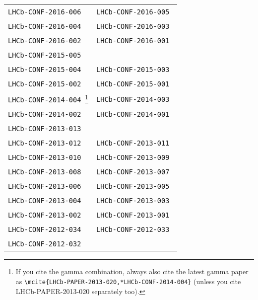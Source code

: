 \begin{center}
\begin{longtable}{ll}
\texttt{LHCb-CONF-2016-006}~\cite{LHCb-CONF-2016-006} &
\texttt{LHCb-CONF-2016-005}~\cite{LHCb-CONF-2016-005} \\
\texttt{LHCb-CONF-2016-004}~\cite{LHCb-CONF-2016-004} &
\texttt{LHCb-CONF-2016-003}~\cite{LHCb-CONF-2016-003} \\
\texttt{LHCb-CONF-2016-002}~\cite{LHCb-CONF-2016-002} &
\texttt{LHCb-CONF-2016-001}~\cite{LHCb-CONF-2016-001} \\
\midrule
\texttt{LHCb-CONF-2015-005}~\cite{LHCb-CONF-2015-005} \\
\texttt{LHCb-CONF-2015-004}~\cite{LHCb-CONF-2015-004} &
\texttt{LHCb-CONF-2015-003}~\cite{LHCb-CONF-2015-003} \\
\texttt{LHCb-CONF-2015-002}~\cite{LHCb-CONF-2015-002} &
\texttt{LHCb-CONF-2015-001}~\cite{LHCb-CONF-2015-001} \\
\midrule
\texttt{LHCb-CONF-2014-004}~\cite{LHCb-CONF-2014-004}\footnote{If you cite 
the gamma combination, always also cite the latest gamma paper as
\texttt{\textbackslash{}mcite\{LHCb-PAPER-2013-020,*LHCb-CONF-2014-004\}}
(unless you cite LHCb-PAPER-2013-020 separately too).} &
\texttt{LHCb-CONF-2014-003}~\cite{LHCb-CONF-2014-003} \\
\texttt{LHCb-CONF-2014-002}~\cite{LHCb-CONF-2014-002} &
\texttt{LHCb-CONF-2014-001}~\cite{LHCb-CONF-2014-001} \\
\midrule
\texttt{LHCb-CONF-2013-013}~\cite{LHCb-CONF-2013-013} \\
\texttt{LHCb-CONF-2013-012}~\cite{LHCb-CONF-2013-012} &
\texttt{LHCb-CONF-2013-011}~\cite{LHCb-CONF-2013-011} \\
\texttt{LHCb-CONF-2013-010}~\cite{LHCb-CONF-2013-010} &
\texttt{LHCb-CONF-2013-009}~\cite{LHCb-CONF-2013-009} \\
\texttt{LHCb-CONF-2013-008}~\cite{LHCb-CONF-2013-008} &
\texttt{LHCb-CONF-2013-007}~\cite{LHCb-CONF-2013-007} \\
\texttt{LHCb-CONF-2013-006}~\cite{LHCb-CONF-2013-006} &
\texttt{LHCb-CONF-2013-005}~\cite{LHCb-CONF-2013-005} \\
\texttt{LHCb-CONF-2013-004}~\cite{LHCb-CONF-2013-004} &
\texttt{LHCb-CONF-2013-003}~\cite{LHCb-CONF-2013-003} \\
\texttt{LHCb-CONF-2013-002}~\cite{LHCb-CONF-2013-002} &
\texttt{LHCb-CONF-2013-001}~\cite{LHCb-CONF-2013-001} \\
\midrule
\texttt{LHCb-CONF-2012-034}~\cite{LHCb-CONF-2012-034} & 
\texttt{LHCb-CONF-2012-033}~\cite{LHCb-CONF-2012-033} \\
\texttt{LHCb-CONF-2012-032}~\cite{LHCb-CONF-2012-032} & 

\end{longtable}
\end{center}
